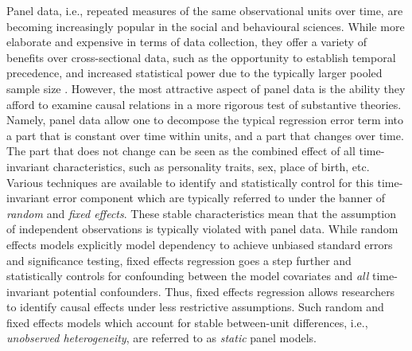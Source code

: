 \documentclass[]{interact}
\theoremstyle{plain}%
\theoremstyle{definition}
\theoremstyle{remark}
\begin{document}
Panel data, i.e., repeated measures of the same observational units over
time, are becoming increasingly popular in the social and behavioural
sciences. While more elaborate and expensive in terms of data
collection, they offer a variety of benefits over cross-sectional data,
such as the opportunity to establish temporal precedence, and increased
statistical power due to the typically larger pooled sample size
\citep{Curran2011}. However, the most attractive aspect of panel data is
the ability they afford to examine causal relations in a more rigorous
test of substantive theories. Namely, panel data allow one to decompose
the typical regression error term into a part that is constant over time
within units, and a part that changes over time. The part that does not
change can be seen as the combined effect of all time-invariant
characteristics, such as personality traits, sex, place of birth, etc.
Various techniques are available to identify and statistically control
for this time-invariant error component which are typically referred to
under the banner of \emph{random} and \emph{fixed effects}. These stable
characteristics mean that the assumption of independent observations is
typically violated with panel data. While random effects models
explicitly model dependency to achieve unbiased standard errors and
significance testing, fixed effects regression goes a step further and
statistically controls for confounding between the model covariates and
\emph{all} time-invariant potential confounders. Thus, fixed effects
regression allows researchers to identify causal effects under less
restrictive assumptions. Such random and fixed effects models which
account for stable between-unit differences, i.e., \emph{unobserved
heterogeneity}, are referred to as \emph{static} panel models.
\end{document}
